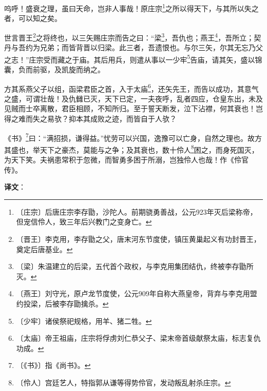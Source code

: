\documentclass[12pt,UTF-8,openany]{ctexbook}
\begin{document}
\begin{normalsize}
    
    呜呼！盛衰之理，虽曰天命，岂非人事哉！原庄宗\footnote{〔庄宗〕后唐庄宗李存勖，沙陀人。前期骁勇善战，公元923年灭后梁称帝，但宠信伶人，致三年后兴教门之变身亡。}之所以得天下，与其所以失之者，可以知之矣。
    
    世言晋王\footnote{〔晋王〕李克用，李存勖之父，唐末河东节度使，镇压黄巢起义有功封晋王，奠定后唐基业。}之将终也，以三矢赐庄宗而告之曰：“梁\footnote{〔梁〕朱温建立的后梁，五代首个政权，与李克用集团结仇，终被李存勖所灭。}，吾仇也；燕王\footnote{〔燕王〕刘守光，原卢龙节度使，公元909年自称大燕皇帝，背弃与李克用盟约投梁，后被李存勖擒杀。}，吾所立；契丹与吾约为兄弟；而皆背晋以归梁。此三者，吾遗恨也。与尔三矢，尔其无忘乃父之志！”庄宗受而藏之于庙。其后用兵，则遣从事以一少牢\footnote{〔少牢〕诸侯祭祀规格，用羊、猪二牲。}告庙，请其矢，盛以锦囊，负而前驱，及凯旋而纳之。
    
    方其系燕父子以组，函梁君臣之首，入于太庙\footnote{〔太庙〕帝王祖庙，庄宗将俘虏刘仁恭父子、梁末帝首级献祭太庙，标志复仇功成。}，还矢先王，而告以成功，其意气之盛，可谓壮哉！及仇雠已灭，天下已定，一夫夜呼，乱者四应，仓皇东出，未及见贼而士卒离散，君臣相顾，不知所归。至于誓天断发，泣下沾襟，何其衰也！岂得之难而失之易欤？抑本其成败之迹，而皆自于人欤？
    
    《书》\footnote{〔《书》〕指《尚书》。}曰：“满招损，谦得益。”忧劳可以兴国，逸豫可以亡身，自然之理也。故方其盛也，举天下之豪杰，莫能与之争；及其衰也，数十伶人\footnote{〔伶人〕宫廷艺人，特指郭从谦等得势伶官，发动叛乱射杀庄宗。}困之，而身死国灭，为天下笑。夫祸患常积于忽微，而智勇多困于所溺，岂独伶人也哉！作《伶官传》。
\end{normalsize}


\newpage

\textbf{译文}：

\vspace{1em}
\end{document}
